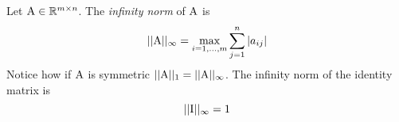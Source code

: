 \begin{example}
    Let $\mathrm{A} \in \mathbb{R}^{m \times n}$. The \textit{infinity norm} of $\mathrm{A}$ is
    $$ ||\mathrm{A}||_{\infty} = \max_{i = 1, \hdots, m}{\sum_{j=1}^{n}{|a_{ij}|}} $$
    Notice how if $\mathrm{A}$ is symmetric $||\mathrm{A}||_1 = ||\mathrm{A}||_{\infty}$. The infinity norm of the identity matrix is
    $$ ||\mathrm{I}||_{\infty} = 1 $$
\end{example}